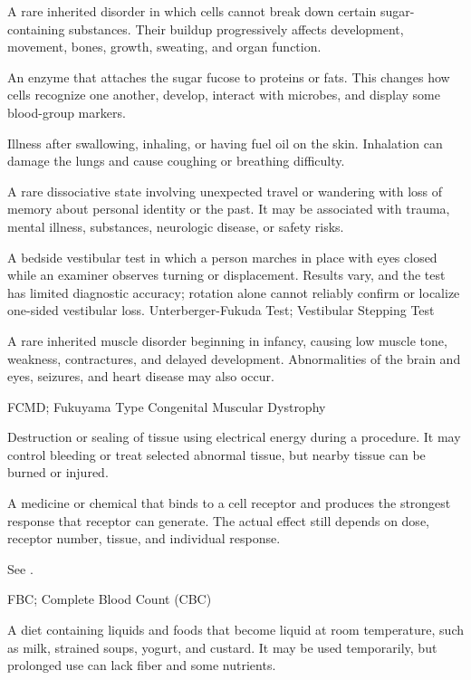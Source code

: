  A rare inherited disorder in which cells cannot break down certain sugar-containing substances. Their buildup progressively affects development, movement, bones, growth, sweating, and organ function.

 An enzyme that attaches the sugar fucose to proteins or fats. This changes how cells recognize one another, develop, interact with microbes, and display some blood-group markers.

 Illness after swallowing, inhaling, or having fuel oil on the skin. Inhalation can damage the lungs and cause coughing or breathing difficulty.

 A rare dissociative state involving unexpected travel or wandering with loss of memory about personal identity or the past. It may be associated with trauma, mental illness, substances, neurologic disease, or safety risks.

 A bedside vestibular test in which a person marches in place with eyes closed while an examiner observes turning or displacement. Results vary, and the test has limited diagnostic accuracy; rotation alone cannot reliably confirm or localize one-sided vestibular loss.
\synonyms
Unterberger-Fukuda Test; Vestibular Stepping Test

 A rare inherited muscle disorder beginning in infancy, causing low muscle tone, weakness, contractures, and delayed development. Abnormalities of the brain and eyes, seizures, and heart disease may also occur.

\synonyms
FCMD; Fukuyama Type Congenital Muscular Dystrophy

 Destruction or sealing of tissue using electrical energy during a procedure. It may control bleeding or treat selected abnormal tissue, but nearby tissue can be burned or injured.

 A medicine or chemical that binds to a cell receptor and produces the strongest response that receptor can generate. The actual effect still depends on dose, receptor number, tissue, and individual response.

 See .

\synonyms
FBC; Complete Blood Count (CBC)

 A diet containing liquids and foods that become liquid at room temperature, such as milk, strained soups, yogurt, and custard. It may be used temporarily, but prolonged use can lack fiber and some nutrients.

